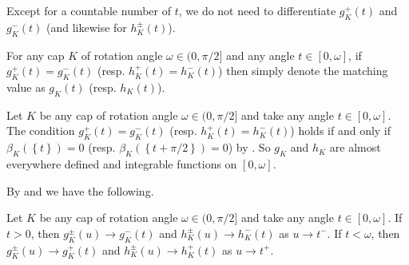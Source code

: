 Except for a countable number of \(t\), we do not need to differentiate \(g_K^+(t)\) and \(g_K^-(t)\) (and likewise for \(h_K^{\pm}(t)\)).

\begin{definition}

For any cap \(K\) of rotation angle \(\omega \in (0, \pi/2]\) and any angle \(t \in [0, \omega]\), if \(g_K^+(t) = g_K^-(t)\) (resp. \(h_K^+(t) = h_K^-(t)\)) then simply denote the matching value as \(g_K(t)\) (resp. \(h_K(t)\)).

\label{def:arm-length-unsinged}
\end{definition}

\begin{proposition}

Let \(K\) be any cap of rotation angle \(\omega \in (0, \pi/2]\) and take any angle \(t \in [0, \omega]\). The condition \(g_K^+(t) = g_K^-(t)\) (resp. \(h_K^+(t) = h_K^-(t)\)) holds if and only if \(\beta_K(\left\{ t \right\}) = 0\) (resp. \(\beta_K(\left\{ t + \pi/2 \right\}) = 0\)) by . So \(g_K\) and \(h_K\) are almost everywhere defined and integrable functions on \([0, \omega]\).

\label{pro:arm-length-unsigned}
\end{proposition}

By  and  we have the following.

\begin{corollary}

Let \(K\) be any cap of rotation angle \(\omega \in (0, \pi/2]\) and take any angle \(t \in [0, \omega]\). If \(t > 0\), then \(g_K^{\pm}(u) \to g_K^-(t)\) and \(h_K^{\pm}(u) \to h_K^-(t)\) as \(u \to t^-\). If \(t < \omega\), then \(g_K^{\pm}(u) \to g_K^+(t)\) and \(h_K^{\pm}(u) \to h_K^+(t)\) as \(u \to t^+\).

\label{cor:arm-length-continuity}
\end{corollary}